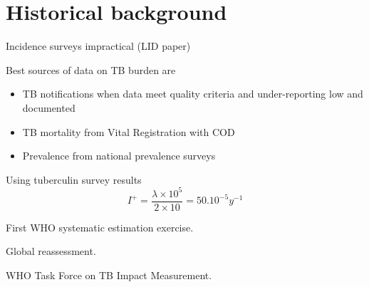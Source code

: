 \section{Historical background}

Incidence surveys impractical\cite{18201929} (LID paper)

Best sources of data on TB burden are 
\begin{itemize}
\item TB notifications when data meet quality criteria and under-reporting low and documented
\item TB mortality from Vital Registration with COD
\item Prevalence from national prevalence surveys
\end{itemize}

Using tuberculin survey results\cite{Styblo1985}
$$I^+ = \frac{\lambda \times 10^5}{2 \times 10} = 50.10^{-5} y^{-1}$$

First WHO systematic estimation exercise\cite{1600578}.

Global reassessment\cite{10517722}.

WHO Task Force on TB Impact Measurement.



  
  
  
  
  
  
  
  
  